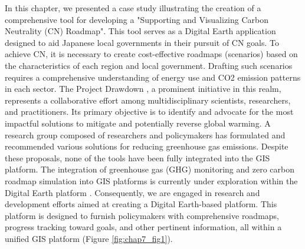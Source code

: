 In this chapter, we presented a case study illustrating the creation of a comprehensive tool for developing a "Supporting and Visualizing Carbon Neutrality (CN) Roadmap". This tool serves as a Digital Earth application designed to aid Japanese local governments in their pursuit of CN goals. To achieve CN, it is necessary to create cost-effective roadmaps (scenarios) based on the characteristics of each region and local government. Drafting such scenarios requires a comprehensive understanding of energy use and CO2 emission patterns in each sector. The Project Drawdown \citep{brennan2020project}, a prominent initiative in this realm, represents a collaborative effort among multidisciplinary scientists, researchers, and practitioners. Its primary objective is to identify and advocate for the most impactful solutions to mitigate and potentially reverse global warming. A research group composed of researchers and policymakers has formulated and recommended various solutions for reducing greenhouse gas emissions. Despite these proposals, none of the tools have been fully integrated into the GIS platform. The integration of greenhouse gas (GHG) monitoring and zero carbon roadmap simulation into GIS platforms is currently under exploration within the Digital Earth platform \citep{fukui2021digital}. Consequently, we are engaged in research and development efforts aimed at creating a Digital Earth-based platform. This platform is designed to furnish policymakers with comprehensive roadmaps, progress tracking toward goals, and other pertinent information, all within a unified GIS platform (Figure \ref{fig:chap7_fig1}). \par

